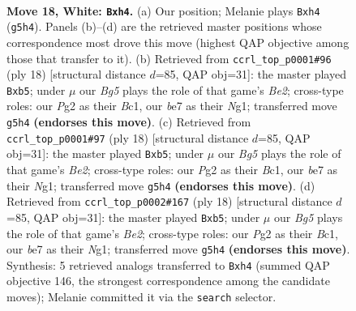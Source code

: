 \documentclass[11pt]{article}
\begin{document}
\clearpage

\begin{figure}[p]\centering
\begin{subfigure}{0.46\textwidth}\centering
\resizebox{\linewidth}{!}{%
\newchessgame
\chessboard[
  setfen={rnbqk1r1/4bp2/1p1p1n2/p1pP2B1/P3P2p/2N2N1P/RP1Q2P1/4KB1R w Kq - 3 18},
  showmover=false,
  pgfstyle=straightmove, color=movearrow, markmove={g5-h4}
]}
\caption{}
\end{subfigure}\hfill
\begin{subfigure}{0.46\textwidth}\centering
\resizebox{\linewidth}{!}{%
\newchessgame
\chessboard[
  setfen={rnbq1rk1/4ppbp/3p1np1/1ppP4/P3P2P/2N5/1P2BPP1/R1BQK1NR w KQ - 0 10},
  showmover=false,
  pgfstyle=straightmove, color=movearrow, markmove={e2-b5}
]}
\caption{}
\end{subfigure}
\\[4pt]
\begin{subfigure}{0.46\textwidth}\centering
\resizebox{\linewidth}{!}{%
\newchessgame
\chessboard[
  setfen={rnbq1rk1/4ppbp/3p1np1/1ppP4/P3P2P/2N5/1P2BPP1/R1BQK1NR w KQ - 0 10},
  showmover=false,
  pgfstyle=straightmove, color=movearrow, markmove={e2-b5}
]}
\caption{}
\end{subfigure}\hfill
\begin{subfigure}{0.46\textwidth}\centering
\resizebox{\linewidth}{!}{%
\newchessgame
\chessboard[
  setfen={rnbq1rk1/4ppbp/3p1np1/1ppP4/P3P2P/2N5/1P2BPP1/R1BQK1NR w KQ - 0 10},
  showmover=false,
  pgfstyle=straightmove, color=movearrow, markmove={e2-b5}
]}
\caption{}
\end{subfigure}
\caption{\textbf{Move 18, White: \texttt{Bxh4}.} (a) Our position; Melanie plays \texttt{Bxh4} (\texttt{g5h4}). Panels (b)--(d) are the retrieved master positions whose correspondence most drove this move (highest QAP objective among those that transfer to it). (b) Retrieved from \texttt{ccrl\_top\_p0001\#96} (ply 18) [structural distance $d$=85, QAP obj=31]: the master played \texttt{Bxb5}; under $\mu$ our \emph{Bg5} plays the role of that game's \emph{Be2}; cross-type roles: our \emph{P}g2 as their \emph{B}c1, our \emph{b}e7 as their \emph{N}g1; transferred move \texttt{g5h4} \textbf{(endorses this move)}. (c) Retrieved from \texttt{ccrl\_top\_p0001\#97} (ply 18) [structural distance $d$=85, QAP obj=31]: the master played \texttt{Bxb5}; under $\mu$ our \emph{Bg5} plays the role of that game's \emph{Be2}; cross-type roles: our \emph{P}g2 as their \emph{B}c1, our \emph{b}e7 as their \emph{N}g1; transferred move \texttt{g5h4} \textbf{(endorses this move)}. (d) Retrieved from \texttt{ccrl\_top\_p0002\#167} (ply 18) [structural distance $d$=85, QAP obj=31]: the master played \texttt{Bxb5}; under $\mu$ our \emph{Bg5} plays the role of that game's \emph{Be2}; cross-type roles: our \emph{P}g2 as their \emph{B}c1, our \emph{b}e7 as their \emph{N}g1; transferred move \texttt{g5h4} \textbf{(endorses this move)}. Synthesis: 5 retrieved analogs transferred to \texttt{Bxh4} (summed QAP objective 146, the strongest correspondence among the candidate moves); Melanie committed it via the \texttt{search} selector.}
\label{fig:thought-m34}
\end{figure}
\end{document}
